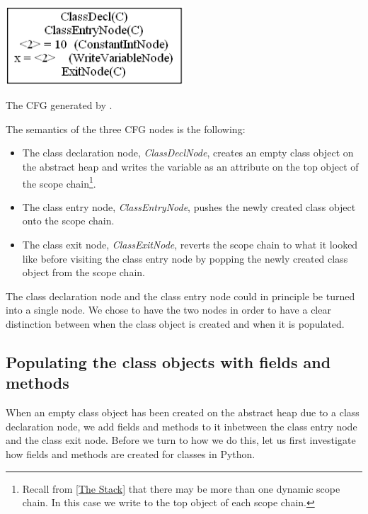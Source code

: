 \begin{listing}[H]
	\begin{center}
		\includegraphics[width=0.5\textwidth]{images/class-decl-cfg.png}
	\end{center}
	\vspace{-10pt}
	\caption{The CFG generated by .}
\end{listing}

The semantics of the three CFG nodes is the following:

\begin{itemize}
	\item The class declaration node, \textit{ClassDeclNode}, creates an empty class object on the abstract heap and writes the variable  as an attribute on the top object of the scope chain\footnote{Recall from \autoref{The Stack} that there may be more than one dynamic scope chain. In this case we write  to the top object of each scope chain.}.
	\item The class entry node, \textit{ClassEntryNode}, pushes the newly created class object onto the scope chain.
	\item The class exit node, \textit{ClassExitNode}, reverts the scope chain to what it looked like before visiting the class entry node by popping the newly created class object from the scope chain.
\end{itemize}

The class declaration node and the class entry node could in principle be turned into a single node. We chose to have the two nodes in order to have a clear distinction between when the class object is created and when it is populated.


\subsection{Populating the class objects with fields and methods}
When an empty class object has been created on the abstract heap due to a class declaration node, we add fields and methods to it inbetween the class entry node and the class exit node. Before we turn to how we do this, let us first investigate how fields and methods are created for classes in Python.

